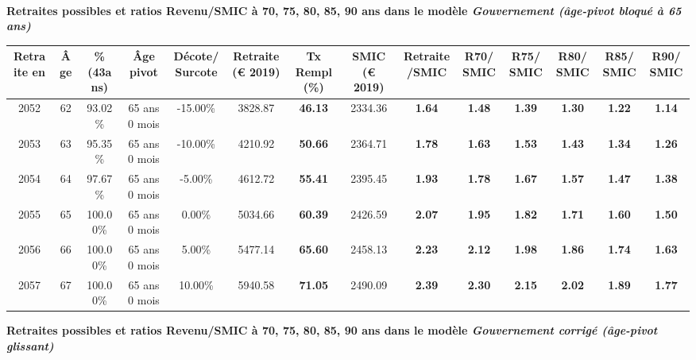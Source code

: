  ~\\{\bf \noindent Retraites possibles et ratios Revenu/SMIC à 70, 75, 80, 85, 90 ans dans le modèle \emph{Gouvernement (âge-pivot bloqué à 65 ans)}}  
 
\begin{adjustbox}{max width=\textwidth} 
\begin{tabular}[htb]{|c|c||c|c|c||c|c||c|c||c|c|c|c|c|} 
\hline 
 Retraite en &  Âge &  \%(43ans) &  Âge pivot &  Décote/Surcote &  Retraite (\euro{} 2019) &  Tx Rempl(\%) &  SMIC (\euro{} 2019) &  Retraite/SMIC &  R70/SMIC &  R75/SMIC &  R80/SMIC &  R85/SMIC &  R90/SMIC \\ 
\hline \hline 
 2052 &  62 &  93.02\% &  65 ans 0 mois &  -15.00\% &  3828.87 &  {\bf 46.13} &  2334.36 &  {\bf 1.64} &  {\bf 1.48} &  {\bf 1.39} &  {\bf 1.30} &  {\bf 1.22} &  {\bf 1.14} \\ 
\hline 
 2053 &  63 &  95.35\% &  65 ans 0 mois &  -10.00\% &  4210.92 &  {\bf 50.66} &  2364.71 &  {\bf 1.78} &  {\bf 1.63} &  {\bf 1.53} &  {\bf 1.43} &  {\bf 1.34} &  {\bf 1.26} \\ 
\hline 
 2054 &  64 &  97.67\% &  65 ans 0 mois &  -5.00\% &  4612.72 &  {\bf 55.41} &  2395.45 &  {\bf 1.93} &  {\bf 1.78} &  {\bf 1.67} &  {\bf 1.57} &  {\bf 1.47} &  {\bf 1.38} \\ 
\hline 
 2055 &  65 &  100.00\% &  65 ans 0 mois &  0.00\% &  5034.66 &  {\bf 60.39} &  2426.59 &  {\bf 2.07} &  {\bf 1.95} &  {\bf 1.82} &  {\bf 1.71} &  {\bf 1.60} &  {\bf 1.50} \\ 
\hline 
 2056 &  66 &  100.00\% &  65 ans 0 mois &  5.00\% &  5477.14 &  {\bf 65.60} &  2458.13 &  {\bf 2.23} &  {\bf 2.12} &  {\bf 1.98} &  {\bf 1.86} &  {\bf 1.74} &  {\bf 1.63} \\ 
\hline 
 2057 &  67 &  100.00\% &  65 ans 0 mois &  10.00\% &  5940.58 &  {\bf 71.05} &  2490.09 &  {\bf 2.39} &  {\bf 2.30} &  {\bf 2.15} &  {\bf 2.02} &  {\bf 1.89} &  {\bf 1.77} \\ 
\hline 
\hline 
\end{tabular} 
\end{adjustbox} 
 
 \vspace{0.1cm} 
{\bf \noindent Retraites possibles et ratios Revenu/SMIC à 70, 75, 80, 85, 90 ans dans le modèle \emph{Gouvernement corrigé (âge-pivot glissant)}}  
 
